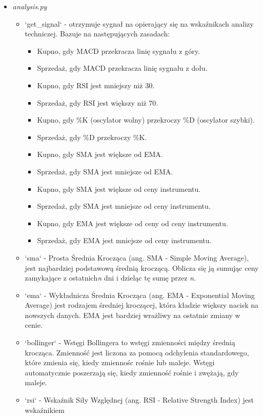 \documentclass[12pt]{article}
\begin{document}
\begin{itemize}
\begin{itemize}
		\end{itemize}
		\item \textit{analysis.py}
		\begin{itemize}
			\item `get\_signal` - otrzymuje sygnał na opierający się na wskaźnikach analizy techniczej.
			Bazuje na następujących zasadach:
			\begin{itemize}
				\item Kupno, gdy MACD przekracza linię sygnału z góry.
				\item Sprzedaż, gdy MACD przekracza linię sygnału z dołu.
				\item Kupno, gdy RSI jest mniejszy niż 30.
				\item Sprzedaż, gdy RSI jest większy niż 70.
				\item Kupno, gdy \%K (oscylator wolny) przekroczy \%D (oscylator szybki).
				\item Sprzedaż, gdy \%D przekroczy \%K.
				\item Kupno, gdy SMA jest większe od EMA.
				\item Sprzedaż, gdy SMA jest mniejsze od EMA.
				\item Kupno, gdy SMA jest większe od ceny instrumentu.
				\item Sprzedaż, gdy SMA jest mniejsze od ceny instrumentu.
				\item Kupno, gdy EMA jest większe od ceny od ceny instrumentu.
				\item Sprzedaż, gdy EMA jest mniejsze od ceny instrumentu.
			\end{itemize}
			\item `sma` - Prosta Średnia Krocząca (ang. SMA - Simple Moving Average), jest
			najbardziej podstawową średnią kroczącą.
			Oblicza się ją sumując ceny zamykające z ostatnich\textit{n} dni i dzieląc tę sumę przez \textit{n}.
			\item `ema` - Wykładnicza Średnia Krocząca (ang. EMA - Exponential Moving Average) jest rodzajem
			średniej kroczącej, która kładzie większy nacisk na nowszych danych.
			EMA jest bardziej wrażliwy na ostatnie zmiany w cenie.
			\item `bollinger` - Wstęgi Bollingera to wstęgi zmienności między średnią krocząca.
			Zmienność jest liczona za pomocą odchylenia standardowego, które zmienia się, kiedy
			zmiennośc rośnie lub maleje.
			Wstęgi automatycznie poszerzają się, kiedy zmienność rośnie i zwężają, gdy maleje.
			\item `rsi` - Wskaźnik Siły Względnej (ang. RSI - Relative Strength Index) jest wskaźnikiem

\end{itemize}
\end{itemize}
\end{document}

